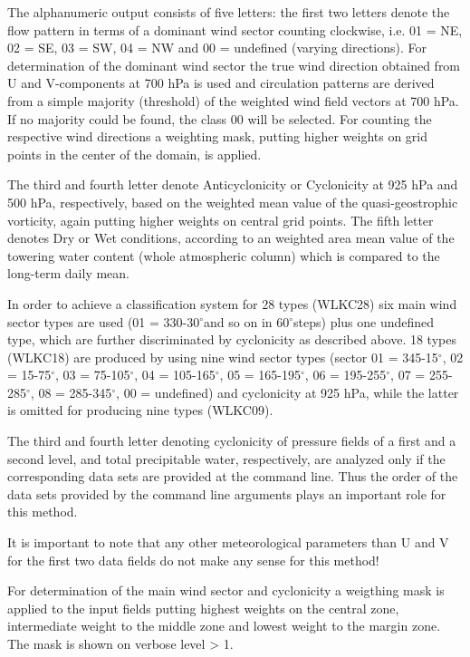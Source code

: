 \documentclass[12pt, oneside, a4paper, headsepline, plainheadsepline]{scrbook}
\newcommand{\degree}{\ensuremath{^\circ}}
\begin{document}
The alphanumeric output consists of five letters: the first two letters denote the flow pattern in terms of a dominant wind sector counting clockwise, i.e. 01 = NE, 02 = SE, 03 = SW, 04 = NW and 00 = undefined (varying directions). For determination of the dominant wind sector the true wind direction obtained from U and V-components at 700 hPa is used and circulation patterns are derived from a simple majority (threshold) of the weighted wind field vectors at 700 hPa. If no majority could be found, the class 00 will be selected. For counting the respective wind directions a weighting mask, putting higher weights on grid points in the center of the domain, is applied.

The third and fourth letter denote Anticyclonicity or Cyclonicity at 925 hPa and 500 hPa, respectively, based on the weighted mean value of the quasi-geostrophic vorticity, again putting higher weights on central grid points. 
The fifth letter denotes Dry or Wet conditions, according to an weighted area mean value of the towering water content (whole atmospheric column) which is compared to the long-term daily mean. 

In order to achieve a classification system for 28 types (WLKC28) six main wind sector types are used (01 = 330-30\degree and so on in 60\degree steps) plus one undefined type, which are further discriminated by cyclonicity as described above. 
18 types (WLKC18) are produced by using nine wind sector types (sector 01 = 345-15\degree, 02 = 15-75\degree, 03 = 75-105\degree, 04 = 105-165\degree, 05 = 165-195\degree, 06 = 195-255\degree, 07 = 255-285\degree, 08 = 285-345\degree, 00 = undefined) and cyclonicity at 925 hPa, while the latter is omitted for producing nine types (WLKC09).

The third and fourth letter denoting cyclonicity of pressure fields of a first and a second level, and total precipitable water, respectively, are analyzed only if the corresponding data sets are provided at the command line. Thus the order of the data sets provided by the command line arguments plays an important role for this method. 

It is important to note that any other meteorological parameters than U and V for the first two data fields do 
not make any sense for this method!

For determination of the main wind sector and cyclonicity a weigthing mask is applied to the input fields putting
highest weights on the central zone, intermediate weight to the middle zone and lowest weight to the margin zone.
The mask is shown on verbose level > 1.
\end{document}

